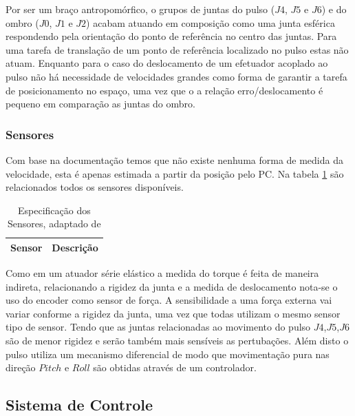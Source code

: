 Por ser um braço antropomórfico, o grupos de juntas do pulso ($J4$, $J5$ e $J6$) e do ombro ($J0$, $J1$ e $J2$) acabam atuando em composição como uma junta esférica respondendo pela orientação do ponto de referência no centro das juntas. Para uma tarefa de translação de um ponto de referência localizado no pulso estas não atuam. Enquanto para o caso do deslocamento de um efetuador acoplado ao pulso não há necessidade de velocidades grandes como forma de garantir a tarefa de posicionamento no espaço, uma vez que o a relação erro/deslocamento é pequeno em comparação as juntas do ombro.


\subsubsection{Sensores}


Com base na documentação temos que não existe nenhuma forma de medida da velocidade, esta é apenas estimada a partir da posição pelo PC. Na tabela \ref{tab:a2armSensorDoc} são relacionados todos os sensores disponíveis.


\begin{table}[H]
    \centering
    \caption{Especificação dos Sensores, adaptado de \cite{mekaguide}}
    \begin{tabular}{ll}
         \hline
         Sensor & Descrição\\
         \hline
         
         \hline
    \end{tabular}
    \label{tab:a2armSensorDoc}
\end{table}

Como em um atuador série elástico a medida do torque é feita de maneira indireta, relacionando a rigidez da junta e a medida de deslocamento nota-se o uso do encoder como sensor de força. A sensibilidade a uma força externa vai variar conforme a rigidez da junta, uma vez que todas utilizam o mesmo sensor tipo de sensor. Tendo que as juntas relacionadas ao movimento do pulso $J4$,$J5$,$J6$ são de menor rigidez e serão também mais sensíveis as pertubações. Além disto o pulso utiliza um mecanismo diferencial de modo que movimentação pura nas direção $Pitch$ e $Roll$ são obtidas através de um controlador.

\subsection{Sistema de Controle}

